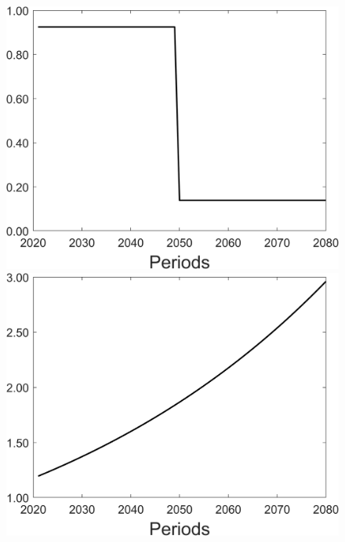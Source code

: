 \begin{figure}[h!!]
\begin{minipage}[]{0.32\textwidth}
	\end{minipage}
	\begin{minipage}[]{0.32\textwidth}
		\includegraphics[width=1\textwidth]{../../codding_model/Own/figures/Rep_agent/staticonlyRam_separate_yd_periods59_eppsilon0.40_zeta1.40_Ad08_Ac04_thetac0.70_thetad0.56_HetGrowth1_tauul0.181_util0_withtarget1_lgd0.png}
	\end{minipage}
	\begin{minipage}[]{0.32\textwidth}
		\includegraphics[width=1\textwidth]{../../codding_model/Own/figures/Rep_agent/staticonlyRam_separate_ydyc_periods59_eppsilon0.40_zeta1.40_Ad08_Ac04_thetac0.70_thetad0.56_HetGrowth1_tauul0.181_util0_withtarget1_lgd0.png}
	\end{minipage}
\end{figure}

